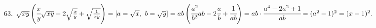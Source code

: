 63. $\sqrt{xy}\left(\cfrac{x}{y}\sqrt{xy}-2\sqrt{\frac{x}{y}}+\sqrt{\frac{1}{xy}}\right)=[a=\sqrt{x},\ b=\sqrt{y}]=
ab\left(\cfrac{a^2}{b^2}ab-2\cfrac{a}{b}+\cfrac{1}{ab}\right)=ab\cdot\cfrac{a^4-2a^2+1}{ab}=(a^2-1)^2=(x-1)^2.$\\
